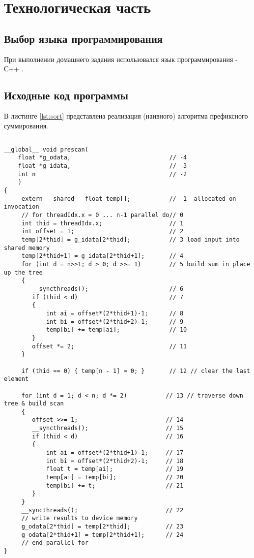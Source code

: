 \chapter{Технологическая часть}

\section{Выбор языка программирования}

При выполнении домашнего задания использовался язык программирования - С++ \cite{csharplang}.


\section{Исходные код программы}
В листинге \ref{lst:sort} представлена реализация (наивного) алгоритма префиксного суммирования.


\begin{lstlisting}[label=lst:sort,caption=Алгоритм parallel\_scan]

__global__ void prescan(
	float *g_odata,                            // -4
	float *g_idata,                            // -3
	int n 		                               // -2
	)
{
	 extern __shared__ float temp[];           // -1  allocated on invocation
	 // for threadIdx.x = 0 ... n-1 parallel do// 0
	 int thid = threadIdx.x;                   // 1
	 int offset = 1;                           // 2
	 temp[2*thid] = g_idata[2*thid];           // 3 load input into shared memory
	 temp[2*thid+1] = g_idata[2*thid+1];       // 4
	 for (int d = n>>1; d > 0; d >>= 1)        // 5 build sum in place up the tree
	 {
		__syncthreads();                       // 6
		if (thid < d)                          // 7
		{
			int ai = offset*(2*thid+1)-1;      // 8
			int bi = offset*(2*thid+2)-1;      // 9
			temp[bi] += temp[ai];              // 10
		}
		offset *= 2;                           // 11
	 }

	 if (thid == 0) { temp[n - 1] = 0; }       // 12 // clear the last element

	 for (int d = 1; d < n; d *= 2)           // 13 // traverse down tree & build scan
	 {
		offset >>= 1;                         // 14
		__syncthreads();                      // 15
		if (thid < d)                         // 16
		{
			int ai = offset*(2*thid+1)-1;     // 17
			int bi = offset*(2*thid+2)-1;     // 18
			float t = temp[ai];               // 19
			temp[ai] = temp[bi];              // 20
			temp[bi] += t;                    // 21
		}
	 }
	 __syncthreads();                         // 22
	 // write results to device memory
	 g_odata[2*thid] = temp[2*thid];          // 23
	 g_odata[2*thid+1] = temp[2*thid+1];	  // 24
	 // end parallel for
}

\end{lstlisting}

